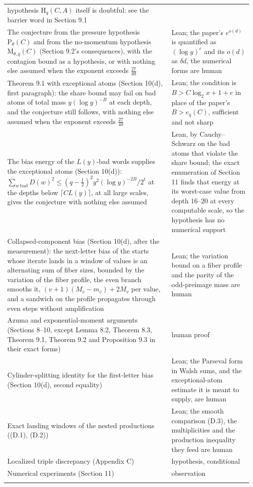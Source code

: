 \documentclass[11pt,a4paper]{article}
\begin{document}
\begin{longtable}[]{@{}
  >{\raggedright\arraybackslash}p{}
  >{\raggedright\arraybackslash}p{}@{}}
hypothesis \(\mathrm H_q(C,A)\) itself is doubtful: see the barrier word
in Section 9.1 \\
The conjecture from the pressure hypothesis \(\mathrm P_\theta(C)\) and
from the no-momentum hypothesis \(\mathrm M_{\theta,q}(C)\) (Section
9.2's consequences), with the contagion bound as a hypothesis, or with
nothing else assumed when the exponent exceeds \(\tfrac{27}{40}\) &
Lean; the paper's \(e^{o(d)}\) is quantified as \((\log y)^\varepsilon\)
and its \(o(d)\) as \(\delta d\), the numerical forms are human \\
Theorem 9.1 with exceptional atoms (Section 10(d), first paragraph): the
share bound may fail on bad atoms of total mass \(y(\log y)^{-B}\) at
each depth, and the conjecture still follows, with nothing else assumed
when the exponent exceeds \(\tfrac{27}{40}\) & Lean; the condition is
\(B>C\log_2x+1+e\) in place of the paper's \(B>e_q(C)\), sufficient and
not sharp \\
The bias energy of the \(L(y)\)-bad words supplies the exceptional atoms
(Section 10(d)):
\(\sum_{w\ \text{bad}}D(w)^2\le(q-\tfrac12)^2y^2(\log y)^{-2B}/2^t\) at
the depths below \(\lceil CL(y)\rceil\), at all large scales, gives the
conjecture with nothing else assumed & Lean, by Cauchy--Schwarz on the
bad atoms that violate the share bound; the exact enumeration of Section
11 finds that energy at its worst-case value from depth \(16\)--\(20\)
at every computable scale, so the hypothesis has no numerical support \\
Collapsed-component bias (Section 10(d), after the measurement): the
next-letter bias of the starts whose iterate lands in a window of values
is an alternating sum of fiber sizes, bounded by the variation of the
fiber profile, the even branch smooths it, \((v+1)(M_v-m_v)+2M_v\) per
value, and a sandwich on the profile propagates through even steps
without amplification & Lean; the variation bound on a fiber profile and
the parity of the odd-preimage mass are human \\
Azuma and exponential-moment arguments (Sections 8--10, except Lemma
8.2, Theorem 8.3, Theorem 9.1, Theorem 9.2 and Proposition 9.3 in their
exact forms) & human proof \\
Cylinder-splitting identity for the first-letter bias (Section 10(d),
second equality) & Lean; the Parseval form in Walsh sums, and the
exceptional-atom estimate it is meant to supply, are human \\
Exact landing windows of the nested productions ((D.1), (D.2)) & Lean;
the smooth comparison (D.3), the multiplicities and the production
inequality they feed are human \\
Localized triple discrepancy (Appendix C) & hypothesis, conditional \\
Numerical experiments (Section 11) & observation \\*
\end{longtable}
\end{document}
